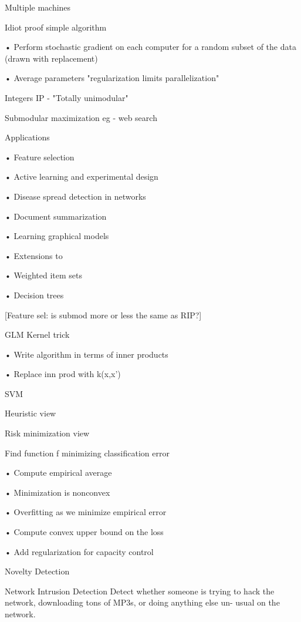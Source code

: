 \documentclass[english]{article}
\begin{document}
Multiple machines

Idiot proof simple algorithm

\benum 
\item 
• Perform stochastic gradient on each
computer for a random subset of the data
(drawn with replacement)
\item 
• Average parameters
"regularization limits parallelization"
\eenum 

\item 
Integers
IP - "Totally unimodular"
\item
Submodular maximization
eg - web search
\item  

Applications

• Feature selection

• Active learning and experimental design


• Disease spread detection in networks

• Document summarization

• Learning graphical models

• Extensions to

• Weighted item sets

• Decision trees

[Feature sel: is submod more or less the same as RIP?]

\eenum 

\item 
 GLM
Kernel trick

• Write algorithm in terms of inner products

• Replace inn prod with k(x,x')
\item 
SVM

Heuristic view

Risk minimization view

Find function f minimizing classification error

• Compute empirical average

• Minimization is nonconvex

• Overfitting as we minimize empirical error

• Compute convex upper bound on the loss

• Add regularization for capacity control

\item

Novelty Detection

Network Intrusion Detection
Detect whether someone is trying to hack the network,
downloading tons of MP3s, or doing anything else un-
usual on the network.
\end{document}
